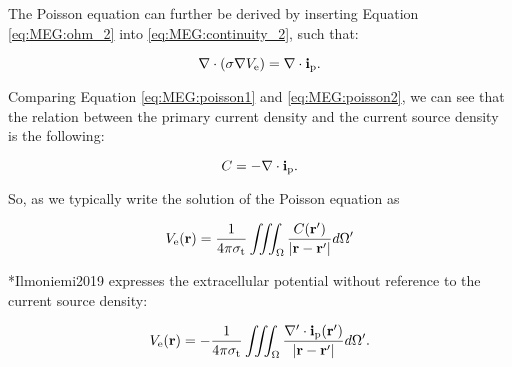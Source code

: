 {The Poisson equation can further be derived by inserting Equation \eqref{eq:MEG:ohm_2} into \eqref{eq:MEG:continuity_2}, such that:

\begin{equation}\label{eq:MEG:poisson2}
{\bf \nabla} \cdot (\sigma {\bf \nabla} V_\mathrm{e}) = {\bf \nabla} \cdot {\bf i}_\mathrm{p}.
\end{equation}


Comparing Equation \eqref{eq:MEG:poisson1} and \eqref{eq:MEG:poisson2}, we can see that the relation between the primary current density and the current source density is the following:

\begin{equation}
C = - {\bf \nabla} \cdot {\bf i}_\mathrm{p}.
\end{equation}

So, as we typically write the solution of the Poisson equation as

\begin{equation}
V_\mathrm{e}({\bf r}) = \frac{1}{4\pi \sigma_\mathrm{t}} \iiint_\Omega \frac{C({\bf r}')}{|{\bf r} - {\bf r}'|} d\Omega' 
\end{equation}

\citeasnoun**{Ilmoniemi2019} expresses the extracellular potential without reference to the current source density:

\begin{equation}
V_\mathrm{e}({\bf r}) = - \frac{1}{4\pi \sigma_\mathrm{t}} \iiint_\Omega \frac{{\bf \nabla}' \cdot {\bf i}_\mathrm{p}({\bf r}')}{|{\bf r} - {\bf r}'|} d\Omega'.
\end{equation}
}



